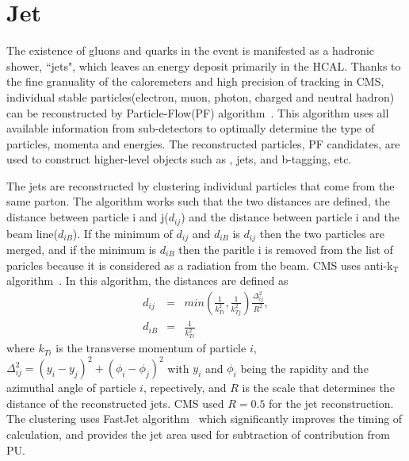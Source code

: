 \section{ Jet }
\label{sec:jet_reco}

The existence of gluons and quarks in the event is manifested as a hadronic shower, 
``jets", which leaves an energy deposit primarily in the HCAL. 
Thanks to the fine granuality of the caloremeters and high precision of tracking in CMS, 
individual stable particles(electron, muon, photon, charged and neutral hadron) 
can be reconstructed by Particle-Flow(PF) algorithm~\cite{PFalgo}. 
This algorithm uses all available information from sub-detectors 
to optimally determine the type of particles, momenta and energies. 
The reconstructed particles, PF candidates, are used to construct higher-level 
objects such as \met, jets, and b-tagging, etc.

The jets are reconstructed by clustering individual particles
that come from the same parton. The algorithm works 
such that the two distances are defined,
the distance between particle i and j($d_{ij}$) 
and the distance between particle i and the beam line($d_{iB}$). 
If the minimum of $d_{ij}$ and $d_{iB}$ is $d_{ij}$ then the two particles are merged,
and if the minimum is $d_{iB}$ then the paritle i is removed from 
the list of paricles because it is considered as a radiation from the beam. 
CMS uses anti-$\textrm{k}_\textrm{T}$ algorithm~\cite{Cacciari:2008gp}. 
In this algorithm, the distances are defined as 
\begin{eqnarray} 
d_{ij} 
&=&   
min \left( \frac{1}{k_{Ti}^2}, \frac{1}{k_{Tj}^2} \right) 
\frac{\Delta_{ij}^2}{R^2}, \\ 
d_{iB} 
&=&  
\frac{1}{k_{Ti}^2}
\end{eqnarray} 
where $k_{Ti}$ is the transverse momentum of particle $i$, 
$\Delta_{ij}^2 = \left( y_i - y_j \right)^2 + \left( \phi_i - \phi_j \right)^2$ 
with $y_i$ and $\phi_i$ being the rapidity and the azimuthal angle of particle $i$,
repectively, and $R$ is the scale that determines the distance of the reconstructed jets.   
CMS used $R = 0.5$ for the jet reconstruction. 
The clustering uses FastJet algorithm~\cite{Cacciari:2005hq} which
significantly improves the timing of calculation, and provides  
the jet area used for subtraction of contribution from PU. 

